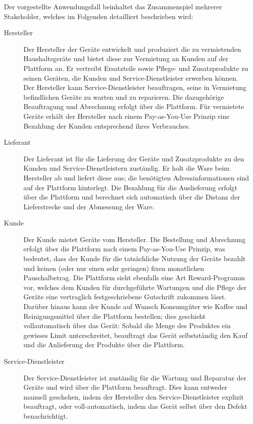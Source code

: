 Der vorgestellte Anwendungsfall beinhaltet das Zusammenspiel mehrerer Stakeholder, welches im Folgenden detailliert beschrieben wird:
\begin{description}
  \item[Hersteller] Der Hersteller der Geräte entwickelt und produziert die zu vermietenden Haushaltsgeräte und bietet diese zur Vermietung an Kunden auf der Plattform an. Er vertreibt Ersatzteile sowie Pflege- und Zusatzprodukte zu seinen Geräten, die Kunden und Service-Dienstleister erwerben können. Der Hersteller kann Service-Dienstleister beauftragen, seine in Vermietung befindlichen Geräte zu warten und zu reparieren. Die dazugehörige Beauftragung und Abrechnung erfolgt über die Plattform. Für vermietete Geräte erhält der Hersteller nach einem Pay-as-You-Use Prinzip eine Bezahlung der Kunden entsprechend ihres Verbrauches.
  \item[Lieferant] Der Lieferant ist für die Lieferung der Geräte und Zusatzprodukte zu den Kunden und Service-Dienstleistern zuständig. Er holt die Ware beim Hersteller ab und liefert diese aus; die benötigten Adressinformationen sind auf der Plattform hinterlegt. Die Bezahlung für die Auslieferung erfolgt über die Plattform und berechnet sich automatisch über die Distanz der Lieferstrecke und der Abmessung der Ware.
  \item[Kunde] Der Kunde mietet Geräte vom Hersteller. Die Bestellung und Abrechnung erfolgt über die Plattform nach einem Pay-as-You-Use Prinzip, was bedeutet, dass der Kunde für die tatsächliche Nutzung der Geräte bezahlt und keinen (oder nur einen sehr geringen) fixen monatlichen Pauschalbetrag. Die Plattform sieht ebenfalls eine Art Reward-Programm vor, welches dem Kunden für durchgeführte Wartungen und die Pflege der Geräte eine vertraglich festgeschriebene Gutschrift zukommen lässt. Darüber hinaus kann der Kunde auf Wunsch Konsumgüter wie Kaffee und Reinigungsmittel über die Plattform bestellen; dies geschieht vollautomatisch über das Gerät: Sobald die Menge des Produktes ein gewisses Limit unterschreitet, beauftragt das Gerät selbstständig den Kauf und die Anlieferung der Produkte über die Plattform.
  \item[Service-Dienstleister] Der Service-Dienstleister ist zuständig für die Wartung und Reparatur der Geräte und wird über die Plattform beauftragt. Dies kann entweder manuell geschehen, indem der Hersteller den Service-Dienstleister explizit beauftragt, oder voll-automatisch, indem das Gerät selbst über den Defekt benachrichtigt.
\end{description}

